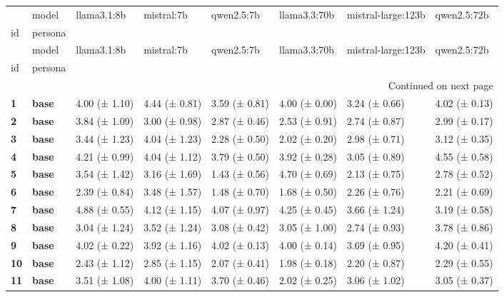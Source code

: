 \begin{longtable}{llllllll}
\toprule
 & model & llama3.1:8b & mistral:7b & qwen2.5:7b & llama3.3:70b & mistral-large:123b & qwen2.5:72b \\
id & persona &  &  &  &  &  &  \\
\midrule
\endfirsthead
\toprule
 & model & llama3.1:8b & mistral:7b & qwen2.5:7b & llama3.3:70b & mistral-large:123b & qwen2.5:72b \\
id & persona &  &  &  &  &  &  \\
\midrule
\endhead
\midrule
\multicolumn{8}{r}{Continued on next page} \\
\midrule
\endfoot
\bottomrule
\endlastfoot
\textbf{1} & \textbf{base} & 4.00 (± 1.10) & 4.44 (± 0.81) & 3.59 (± 0.81) & 4.00 (± 0.00) & 3.24 (± 0.66) & 4.02 (± 0.13) \\
\cline{1-8}
\textbf{2} & \textbf{base} & 3.84 (± 1.09) & 3.00 (± 0.98) & 2.87 (± 0.46) & 2.53 (± 0.91) & 2.74 (± 0.87) & 2.99 (± 0.17) \\
\cline{1-8}
\textbf{3} & \textbf{base} & 3.44 (± 1.23) & 4.04 (± 1.23) & 2.28 (± 0.50) & 2.02 (± 0.20) & 2.98 (± 0.71) & 3.12 (± 0.35) \\
\cline{1-8}
\textbf{4} & \textbf{base} & 4.21 (± 0.99) & 4.04 (± 1.12) & 3.79 (± 0.50) & 3.92 (± 0.28) & 3.05 (± 0.89) & 4.55 (± 0.58) \\
\cline{1-8}
\textbf{5} & \textbf{base} & 3.54 (± 1.42) & 3.16 (± 1.69) & 1.43 (± 0.56) & 4.70 (± 0.69) & 2.13 (± 0.75) & 2.78 (± 0.52) \\
\cline{1-8}
\textbf{6} & \textbf{base} & 2.39 (± 0.84) & 3.48 (± 1.57) & 1.48 (± 0.70) & 1.68 (± 0.50) & 2.26 (± 0.76) & 2.21 (± 0.69) \\
\cline{1-8}
\textbf{7} & \textbf{base} & 4.88 (± 0.55) & 4.12 (± 1.15) & 4.07 (± 0.97) & 4.25 (± 0.45) & 3.66 (± 1.24) & 3.19 (± 0.58) \\
\cline{1-8}
\textbf{8} & \textbf{base} & 3.04 (± 1.24) & 3.52 (± 1.24) & 3.08 (± 0.42) & 3.05 (± 1.00) & 2.74 (± 0.93) & 3.78 (± 0.86) \\
\cline{1-8}
\textbf{9} & \textbf{base} & 4.02 (± 0.22) & 3.92 (± 1.16) & 4.02 (± 0.13) & 4.00 (± 0.14) & 3.69 (± 0.95) & 4.20 (± 0.41) \\
\cline{1-8}
\textbf{10} & \textbf{base} & 2.43 (± 1.12) & 2.85 (± 1.15) & 2.07 (± 0.41) & 1.98 (± 0.18) & 2.20 (± 0.87) & 2.29 (± 0.55) \\
\cline{1-8}
\textbf{11} & \textbf{base} & 3.51 (± 1.08) & 4.00 (± 1.11) & 3.70 (± 0.46) & 2.02 (± 0.25) & 3.06 (± 1.02) & 3.05 (± 0.37) \\

\end{longtable}
